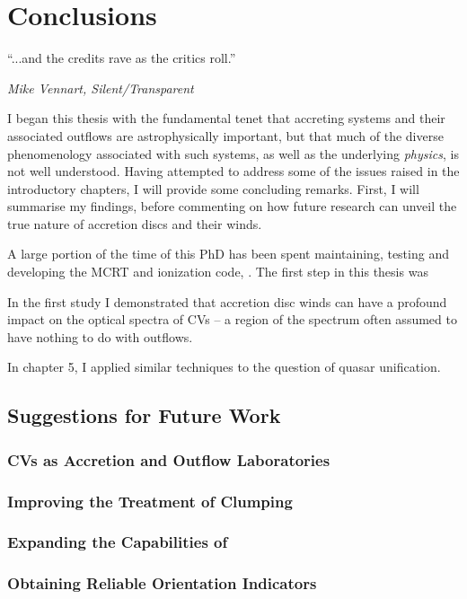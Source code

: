 \chapter{Conclusions}

\epigraph{``...and the credits rave as the critics roll.''}
{{\sl Mike Vennart, Silent/Transparent}}

I began this thesis with the fundamental tenet that accreting systems
and their associated outflows are astrophysically important, but that
much of the diverse phenomenology associated with such systems, as well
as the underlying {\em physics}, is not well understood.  
Having attempted to address some of the issues raised in the 
introductory chapters, I will provide some concluding remarks. 
First, I will summarise my findings, before 
commenting on how future research can unveil the true nature of 
accretion discs and their winds.

A large portion of the time of this PhD has been spent maintaining,
testing and developing the MCRT and ionization code, \py. The first 
step in this thesis was 



In the first study I demonstrated that accretion disc winds
can have a profound impact on the optical spectra of CVs -- a region
of the spectrum often assumed to have nothing to do with outflows.

In chapter 5, I applied similar techniques to the question of quasar 
unification.

\section{Suggestions for Future Work}

\subsection{CVs as Accretion and Outflow Laboratories}

\subsection{Improving the Treatment of Clumping}

\subsection{Expanding the Capabilities of \py}

\subsection{Obtaining Reliable Orientation Indicators}

